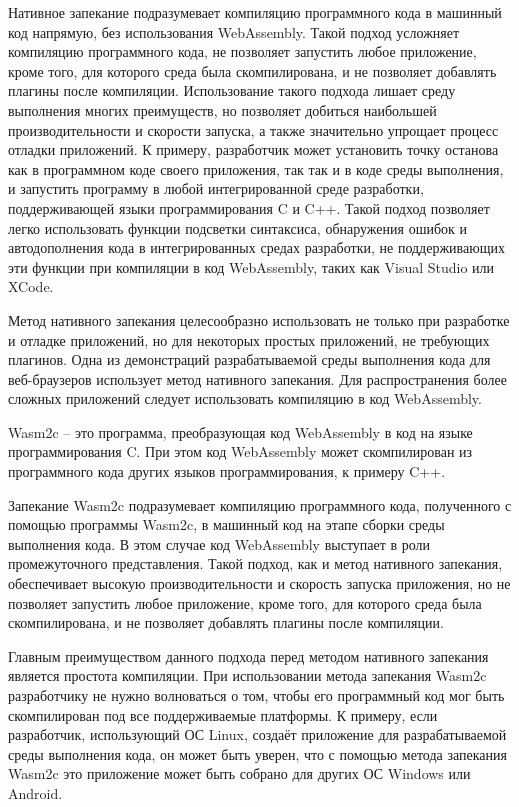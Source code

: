 Нативное запекание подразумевает компиляцию программного кода в машинный код напрямую, без использования WebAssembly.
Такой подход усложняет компиляцию программного кода, не позволяет запустить любое приложение, кроме того, для которого среда была скомпилирована, и не позволяет добавлять плагины после компиляции.
Использование такого подхода лишает среду выполнения многих преимуществ, но позволяет добиться наибольшей производительности и скорости запуска, а также значительно упрощает процесс отладки приложений.
К примеру, разработчик может установить точку останова как в программном коде своего приложения, так так и в коде среды выполнения, и запустить программу в любой интегрированной среде разработки, поддерживающей языки программирования C и C++.
Такой подход позволяет легко использовать функции подсветки синтаксиса, обнаружения ошибок и автодополнения кода в интегрированных средах разработки, не поддерживающих эти функции при компиляции в код WebAssembly, таких как Visual Studio или XCode.

Метод нативного запекания целесообразно использовать не только при разработке и отладке приложений, но для некоторых простых приложений, не требующих плагинов.
Одна из демонстраций разрабатываемой среды выполнения кода для веб-браузеров использует метод нативного запекания.
Для распространения более сложных приложений следует использовать компиляцию в код WebAssembly.

Wasm2c -- это программа, преобразующая код WebAssembly в код на языке программирования C.
При этом код WebAssembly может скомпилирован из программного кода других языков программирования, к примеру C++.

Запекание Wasm2c подразумевает компиляцию программного кода, полученного с помощью программы Wasm2c, в машинный код на этапе сборки среды выполнения кода.
В этом случае код WebAssembly выступает в роли промежуточного представления.
Такой подход, как и метод нативного запекания, обеспечивает высокую производительности и скорость запуска приложения, но не позволяет запустить любое приложение, кроме того, для которого среда была скомпилирована, и не позволяет добавлять плагины после компиляции.

Главным преимуществом данного подхода перед методом нативного запекания является простота компиляции.
При использовании метода запекания Wasm2c разработчику не нужно волноваться о том, чтобы его программный код мог быть скомпилирован под все поддерживаемые платформы.
К примеру, если разработчик, использующий ОС Linux, создаёт приложение для разрабатываемой среды выполнения кода, он может быть уверен, что с помощью метода запекания Wasm2c это приложение может быть собрано для других ОС Windows или Android.
